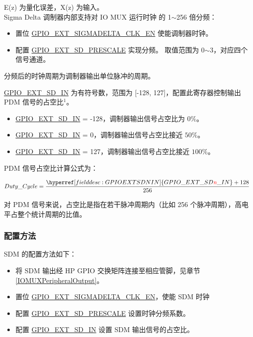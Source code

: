 \documentclass[main\_\_CN.tex]{subfiles}
\begin{document}
E(z) 为量化误差，X(z) 为输入。\\
Sigma Delta 调制器内部支持对 IO MUX 运行时钟 的 1$\sim$256 倍分频：
\begin{itemize}
    \item 置位 \hyperref[fielddesc:GPIOEXTSIGMADELTACLKEN]{GPIO\_EXT\_SIGMADELTA\_CLK\_EN} 使能调制器时钟。
    \item 配置 \hyperref[fielddesc:GPIOEXTSDNPRESCALE]{GPIO\_EXT\_SD\_PRESCALE} 实现分频。 取值范围为 0$\sim$3，对应四个信号通道。
\end{itemize}

分频后的时钟周期为调制器输出单位脉冲的周期。

\hyperref[fielddesc:GPIOEXTSDNIN]{GPIO\_EXT\_SD\_IN} 为有符号数，范围为 [-128, 127]，配置此寄存器控制输出 PDM 信号的占空比$^{1}$。

\begin{itemize}
    \item \hyperref[fielddesc:GPIOEXTSDNIN]{GPIO\_EXT\_SD\_IN} = -128，调制器输出信号占空比为 \begin{math}0\% \end{math}。
    \item \hyperref[fielddesc:GPIOEXTSDNIN]{GPIO\_EXT\_SD\_IN} = 0，调制器输出信号占空比接近 \begin{math}50\% \end{math}。
    \item \hyperref[fielddesc:GPIOEXTSDNIN]{GPIO\_EXT\_SD\_IN} = 127，调制器输出信号占空比接近 \begin{math}100\% \end{math}。
\end{itemize}

PDM 信号占空比计算公式为：

    \[
    Duty\_Cycle=\frac{\hyperref[fielddesc:GPIOEXTSDNIN]{GPIO\_EXT\_SD\regindex{n}\_IN} + 128} {256}
    \]

\begin{tiplisting}
对 PDM 信号来说，占空比是指在若干脉冲周期内（比如 256 个脉冲周期），高电平占整个统计周期的比值。
\end{tiplisting}

\subsubsection{配置方法}

SDM 的配置方法如下：

\begin{itemize}
    \item 将 SDM 输出经 HP GPIO 交换矩阵连接至相应管脚，见章节 \ref{IOMUXPeripheralOutput}。
    \item 置位 \hyperref[fielddesc:GPIOEXTSIGMADELTACLKEN]{GPIO\_EXT\_SIGMADELTA\_CLK\_EN}，使能 SDM 时钟
    \item 配置 \hyperref[fielddesc:GPIOEXTSDNPRESCALE]{GPIO\_EXT\_SD\_PRESCALE} 设置时钟分频系数。
    \item 配置 \hyperref[fielddesc:GPIOEXTSDNIN]{GPIO\_EXT\_SD\_IN} 设置 SDM 输出信号的占空比。
\end{itemize}
\end{document}
